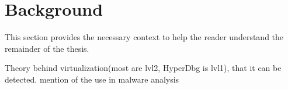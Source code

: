 \section{Background}\label{s:background}

This section provides the necessary context to help the reader understand the
remainder of the thesis.


Theory behind virtualization(most are lvl2, HyperDbg is lvl1), that it can be detected. mention of the use in malware analysis


